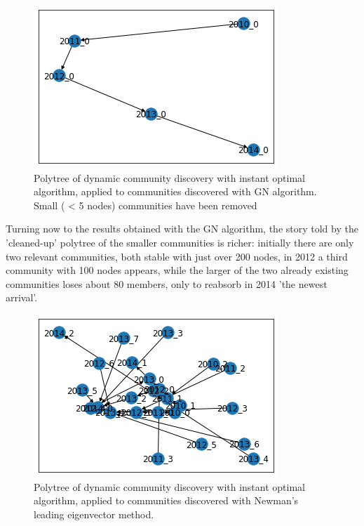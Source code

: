 \documentclass[sigchi]{acmart}
\begin{document}
\begin{figure}[H]
	\centering
	\includegraphics[width=\linewidth]{polyt GN removed.png}
	\caption{Polytree of dynamic community discovery with instant optimal algorithm, applied to communities discovered with GN algorithm. Small ( < 5 nodes) communities have been removed}
\end{figure}

Turning now to the results obtained with the GN algorithm, the story told by the 'cleaned-up' polytree of the smaller communities is richer: initially there are only two relevant communities, both stable with just over 200 nodes, in 2012 a third community with 100 nodes appears, while the larger of the two already existing communities loses about 80 members, only to reabsorb in 2014 'the newest arrival'.

\begin{figure}[H]
	\centering
	\includegraphics[width=\linewidth]{polyt eig full.png}
	\caption{Polytree of dynamic community discovery with instant optimal algorithm, applied to communities discovered with Newman’s leading eigenvector method.}
\end{figure}
\end{document}
